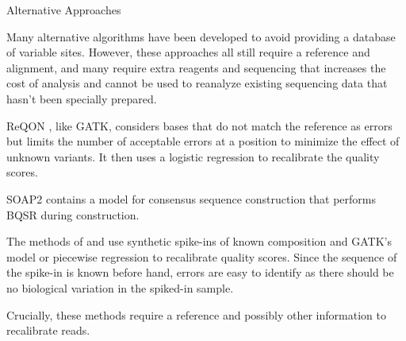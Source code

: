 \documentclass{article}
\begin{document}
\begin{outline}
\begin{outline}
	\end{outline}
	\item Alternative Approaches
		\begin{outline}
		\item Many alternative algorithms have been developed to avoid providing a database of variable sites. However, these approaches all still require a reference and alignment, and many require extra reagents and sequencing that increases the cost of analysis and cannot be used to reanalyze existing sequencing data that hasn't been specially prepared.
		\item ReQON \parencite{cabanski_reqon:_2012}, like GATK, considers bases that do not match the reference as errors but limits the number of acceptable errors at a position to minimize the effect of unknown variants. It then uses a logistic regression to recalibrate the quality scores.
		\item SOAP2 \parencite{li_soap2:_2009} contains a model for consensus sequence construction that performs BQSR during construction. %
		\item The methods of \cite{zook_synthetic_2012} and \cite{ni_improvement_2016} use synthetic spike-ins of known composition and GATK's model \cite{zook_synthetic_2012} or piecewise regression \parencite{ni_improvement_2016} to recalibrate quality scores. Since the sequence of the spike-in is known before hand, errors are easy to identify as there should be no biological variation in the spiked-in sample.
		\item Crucially, these methods require a reference and possibly other information to recalibrate reads.


\end{outline}
\end{outline}
\end{document}
